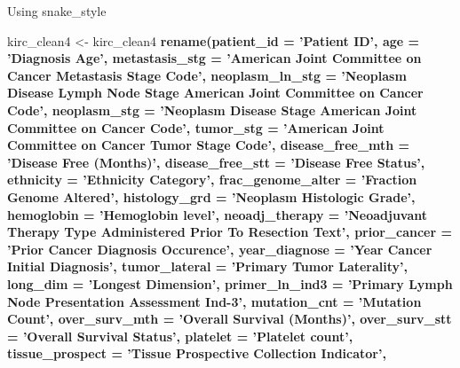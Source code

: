 \documentclass[]{article}
\newenvironment{Shaded}{\begin{snugshade}}{\end{snugshade}}
\newcommand{\KeywordTok}[1]{\textcolor[rgb]{0.13,0.29,0.53}{\textbf{#1}}}
\newcommand{\DataTypeTok}[1]{\textcolor[rgb]{0.13,0.29,0.53}{#1}}
\newcommand{\StringTok}[1]{\textcolor[rgb]{0.31,0.60,0.02}{#1}}
\newcommand{\OperatorTok}[1]{\textcolor[rgb]{0.81,0.36,0.00}{\textbf{#1}}}
\newcommand{\NormalTok}[1]{#1}
\begin{document}
Using snake\_style

\begin{Shaded}
\begin{Highlighting}[]
\NormalTok{kirc_clean4 <-}\StringTok{ }\NormalTok{kirc_clean4 }\OperatorTok{%
\StringTok{     }\KeywordTok{rename}\NormalTok{(}\DataTypeTok{patient_id =} \StringTok{'Patient ID'}\NormalTok{,}
            \DataTypeTok{age =} \StringTok{'Diagnosis Age'}\NormalTok{,}
            \DataTypeTok{metastasis_stg =} \StringTok{'American Joint Committee on Cancer Metastasis Stage Code'}\NormalTok{,}
            \DataTypeTok{neoplasm_ln_stg =} \StringTok{'Neoplasm Disease Lymph Node Stage American Joint Committee on Cancer Code'}\NormalTok{,}
            \DataTypeTok{neoplasm_stg =} \StringTok{'Neoplasm Disease Stage American Joint Committee on Cancer Code'}\NormalTok{,}
            \DataTypeTok{tumor_stg =} \StringTok{'American Joint Committee on Cancer Tumor Stage Code'}\NormalTok{,}
            \DataTypeTok{disease_free_mth =} \StringTok{'Disease Free (Months)'}\NormalTok{,}
            \DataTypeTok{disease_free_stt =} \StringTok{'Disease Free Status'}\NormalTok{,}
            \DataTypeTok{ethnicity =} \StringTok{'Ethnicity Category'}\NormalTok{, }
            \DataTypeTok{frac_genome_alter =} \StringTok{'Fraction Genome Altered'}\NormalTok{,}
            \DataTypeTok{histology_grd =} \StringTok{'Neoplasm Histologic Grade'}\NormalTok{,}
            \DataTypeTok{hemoglobin =} \StringTok{'Hemoglobin level'}\NormalTok{,}
            \DataTypeTok{neoadj_therapy =} \StringTok{'Neoadjuvant Therapy Type Administered Prior To Resection Text'}\NormalTok{,}
            \DataTypeTok{prior_cancer =} \StringTok{'Prior Cancer Diagnosis Occurence'}\NormalTok{,}
            \DataTypeTok{year_diagnose =} \StringTok{'Year Cancer Initial Diagnosis'}\NormalTok{,}
            \DataTypeTok{tumor_lateral =} \StringTok{'Primary Tumor Laterality'}\NormalTok{,}
            \DataTypeTok{long_dim =} \StringTok{'Longest Dimension'}\NormalTok{,}
            \DataTypeTok{primer_ln_ind3 =} \StringTok{'Primary Lymph Node Presentation Assessment Ind-3'}\NormalTok{,}
            \DataTypeTok{mutation_cnt =} \StringTok{'Mutation Count'}\NormalTok{,}
            \DataTypeTok{over_surv_mth =} \StringTok{'Overall Survival (Months)'}\NormalTok{,}
            \DataTypeTok{over_surv_stt =} \StringTok{'Overall Survival Status'}\NormalTok{,}
            \DataTypeTok{platelet =} \StringTok{'Platelet count'}\NormalTok{,}
            \DataTypeTok{tissue_prospect =} \StringTok{'Tissue Prospective Collection Indicator'}\NormalTok{,}
}
\end{Highlighting}
\end{Shaded}
\end{document}
